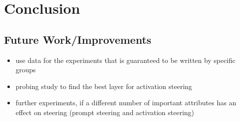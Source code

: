 \chapter{Conclusion}
\label{sec:conclusion}

\section{Future Work/Improvements} %
\begin{itemize}
  \item use data for the experiments that is guaranteed to be written by specific groups
  \item probing study to find the best layer for activation steering
  \item further experiments, if a different number of important attributes has an effect on steering (prompt steering and activation steering)
\end{itemize}
